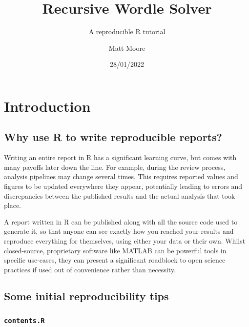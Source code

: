 \documentclass[
]{article}
\title{Recursive Wordle Solver}
\subtitle{A reproducible R tutorial}
\author{Matt Moore}
\date{28/01/2022}
\begin{document}
\maketitle

\hypertarget{introduction}{%
\section{Introduction}\label{introduction}}

\hypertarget{why-use-r-to-write-reproducible-reports}{%
\subsection{Why use R to write reproducible
reports?}\label{why-use-r-to-write-reproducible-reports}}

Writing an entire report in R has a significant learning curve, but
comes with many payoffs later down the line. For example, during the
review process, analysis pipelines may change several times. This
requires reported values and figures to be updated everywhere they
appear, potentially leading to errors and discrepancies between the
published results and the actual analysis that took place.

A report written in R can be published along with all the source code
used to generate it, so that anyone can see exactly how you reached your
results and reproduce everything for themselves, using either your data
or their own. Whilst closed-source, proprietary software like MATLAB can
be powerful tools in specific use-cases, they can present a significant
roadblock to open science practices if used out of convenience rather
than necessity.

\hypertarget{some-initial-reproducibility-tips}{%
\subsection{Some initial reproducibility
tips}\label{some-initial-reproducibility-tips}}

\hypertarget{contents.r}{%
\subsubsection{\texorpdfstring{\texttt{contents.R}}{contents.R}}\label{contents.r}}
\end{document}
